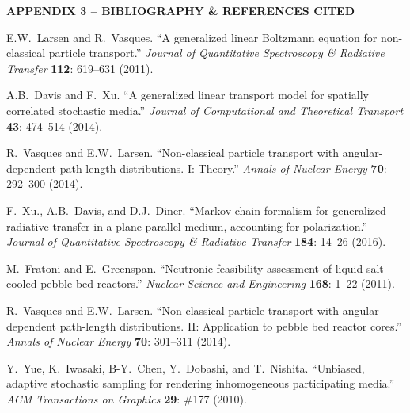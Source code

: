 \documentclass[12pt]{article}
\begin{document}
\pagebreak


\begin{center}
{\bf APPENDIX 3 -- BIBLIOGRAPHY \& REFERENCES CITED} 
\end{center}

\begin{thebibliography}{10}

E.W.~Larsen and R.~Vasques.
``A generalized linear Boltzmann equation for non-classical particle transport.''
\textit{Journal of Quantitative Spectroscopy \& Radiative Transfer} \textbf{112}: 619--631 (2011).\vspace{-5pt}

A.B.~Davis and F.~Xu.
``A generalized linear transport model for spatially correlated stochastic media.''
\textit{Journal of Computational and Theoretical Transport} \textbf{43}: 474--514 (2014).\vspace{-5pt}

R.~Vasques and E.W.~Larsen.
``Non-classical particle transport with angular-dependent path-length distributions. I: Theory.''
\textit{Annals of Nuclear Energy} \textbf{70}: 292--300 (2014).\vspace{-5pt}

F.~Xu., A.B.~Davis, and D.J.~Diner.
``Markov chain formalism for generalized radiative transfer in a plane-parallel medium, accounting for polarization.''
\textit{Journal of Quantitative Spectroscopy \& Radiative Transfer} \textbf{184}: 14--26 (2016).\vspace{-5pt}

M.~Fratoni and E.~Greenspan.
``Neutronic feasibility assessment of liquid salt-cooled pebble bed reactors.''
\textit{Nuclear Science and Engineering} \textbf{168}: 1--22 (2011). \vspace{-5pt}

R.~Vasques and E.W.~Larsen.
``Non-classical particle transport with angular-dependent path-length distributions. II: Application to pebble bed reactor cores.''
\textit{Annals of Nuclear Energy} \textbf{70}: 301--311 (2014). \vspace{-5pt}

Y.~Yue, K.~Iwasaki, B-Y.~Chen, Y.~Dobashi, and T.~Nishita.
``Unbiased, adaptive stochastic sampling for rendering inhomogeneous participating media.''
\textit{ACM Transactions on Graphics} \textbf{29}: \#177 (2010).\vspace{-5pt}


\end{thebibliography}
\end{document}
